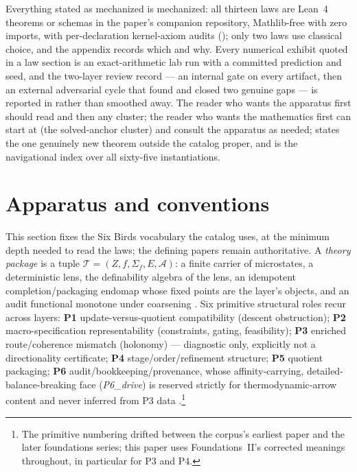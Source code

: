 \documentclass[11pt]{article}
\theoremstyle{definition}
\begin{document}
Everything stated as mechanized is mechanized: all thirteen laws are Lean~4 theorems or schemas in
the paper's companion repository, Mathlib-free with zero imports, with per-declaration kernel-axiom
audits (); only two laws use classical choice, and the appendix records
which and why. Every numerical exhibit quoted in a law section is an exact-arithmetic lab run with a
committed prediction and seed, and the two-layer review record --- an internal gate on every
artifact, then an external adversarial cycle that found and closed two genuine gaps --- is reported
in  rather than smoothed away. The reader who wants the apparatus
first should read  and then any cluster; the reader who wants
the mathematics first can start at  (the solved-anchor cluster) and consult the
apparatus as needed;  states the one genuinely new theorem outside the
catalog proper, and  is the navigational index over all sixty-five
instantiations.

 \section{Apparatus and conventions}\label{sec:apparatus}

This section fixes the Six Birds vocabulary the catalog uses, at the minimum depth needed to read the
laws; the defining papers remain authoritative. A \emph{theory package} is a tuple
$\mathcal{T} = (Z, f, \Sigma_f, E, \mathcal{A})$: a finite carrier of microstates, a deterministic
lens, the definability algebra of the lens, an idempotent completion/packaging endomap whose fixed
points are the layer's objects, and an audit functional monotone under coarsening
\citep{Tsiokos2026EmergenceCalculus}. Six primitive structural roles recur across layers: \textbf{P1}
update-versus-quotient compatibility (descent obstruction); \textbf{P2} macro-specification
representability (constraints, gating, feasibility); \textbf{P3} enriched route/coherence mismatch
(holonomy) --- diagnostic only, explicitly not a directionality certificate; \textbf{P4}
stage/order/refinement structure; \textbf{P5} quotient packaging; \textbf{P6}
audit/bookkeeping/provenance, whose affinity-carrying, detailed-balance-breaking face
(\emph{P6\_drive}) is reserved strictly for thermodynamic-arrow content and never inferred from P3
data \citep{Tsiokos2026FoundII}.\footnote{The primitive numbering drifted between the corpus's
earliest paper and the later foundations series; this paper uses Foundations~II's corrected meanings
throughout, in particular for P3 and P4.}
\end{document}
